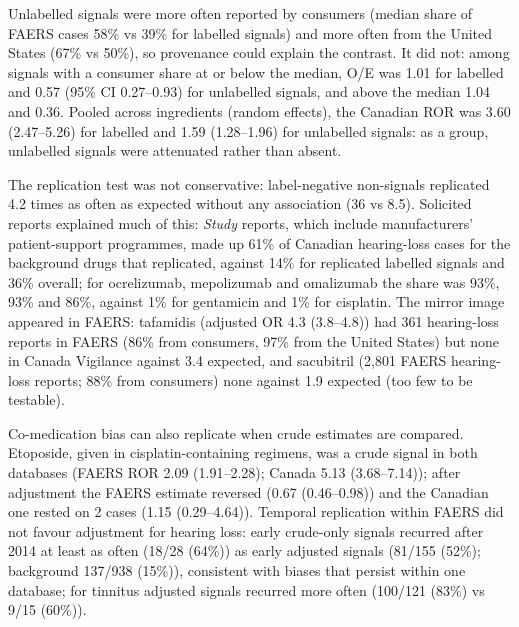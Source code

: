 \documentclass[11pt]{article}
\begin{document}
Unlabelled signals were more often reported by consumers (median share of FAERS cases
58\% vs 39\% for labelled signals) and
more often from the United States (67\% vs 50\%), so
provenance could explain the contrast. It did not: among signals with a consumer share at or below the median, O/E was
1.01 for labelled and
0.57 (95\% CI
0.27--0.93) for
unlabelled signals, and above the median 1.04 and
0.36. Pooled across ingredients (random effects), the Canadian ROR
was 3.60 (2.47--5.26)
for labelled and 1.59 (1.28--1.96)
for unlabelled signals: as a group, unlabelled signals were attenuated rather than absent.

The replication test was not conservative: label-negative non-signals replicated 4.2 times as often as expected without any association
(36 vs 8.5). Solicited reports explained much of this:
\emph{Study} reports, which include manufacturers' patient-support programmes, made up 61\%
of Canadian hearing-loss cases for the background drugs that replicated, against 14\% for
replicated labelled signals and 36\% overall; for ocrelizumab, mepolizumab and omalizumab the share
was 93\%, 93\% and 86\%, against
1\% for gentamicin and 1\% for cisplatin. The mirror image appeared in FAERS:
tafamidis (adjusted OR 4.3 (3.8--4.8)) had
361 hearing-loss reports in FAERS (86\% from consumers,
97\% from the United States) but none in Canada Vigilance against 3.4 expected, and
sacubitril (2{,}801 FAERS hearing-loss reports; 88\% from consumers) none against
1.9 expected (too few to be testable).

Co-medication bias can also replicate when crude estimates are compared. Etoposide, given in cisplatin-containing regimens,
was a crude signal in both databases (FAERS ROR 2.09 (1.91--2.28);
Canada 5.13 (3.68--7.14)); after adjustment the FAERS estimate reversed
(0.67 (0.46--0.98)) and the Canadian one rested on
2 cases (1.15 (0.29--4.64)). Temporal replication within FAERS
did not favour adjustment for hearing loss: early crude-only signals recurred after 2014 at least as often
(18/28 (64\%)) as early adjusted signals (81/155 (52\%); background 137/938 (15\%)),
consistent with biases that persist within one database; for tinnitus adjusted signals recurred more often
(100/121 (83\%) vs 9/15 (60\%)).
\end{document}
